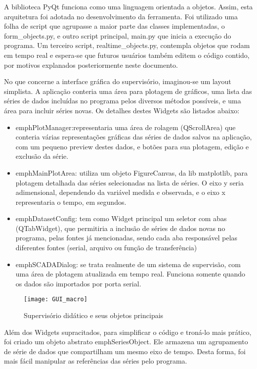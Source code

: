 A biblioteca PyQt funciona como uma linguagem orientada a objetos. Assim, esta arquitetura foi adotada no desenvolvimento da ferramenta. Foi utilizado uma folha de script que agrupasse a maior parte das classes implementadas, o form\_objects.py, e outro script principal, main.py que inicia a execução do programa. Um terceiro script, realtime\_objects.py, contempla objetos que rodam em tempo real e espera-se que futuros usuários também editem o código contido, por motivos explanados posteriormente neste documento.

No que concerne a interface gráfica do supervisório, imaginou-se um layout simplista. A aplicação conteria uma área para plotagem de gráficos, uma lista das séries de dados incluídas no programa pelos diversos métodos possíveis, e uma área para incluir séries novas. Os detalhes destes Widgets são listados abaixo:

\begin{itemize}
	\item emph{PlotManager}:representaria uma área de rolagem (QScrollArea) que conteria várias representações gráficas das séries de dados salvos na aplicação, com um pequeno preview destes dados, e botões para sua plotagem, edição e exclusão da série.
	\item emph{MainPlotArea}: utiliza um objeto FigureCanvas, da lib matplotlib, para plotagem detalhada das séries selecionadas na lista de séries. O eixo y seria adimensional, dependendo da variável medida e observada, e o eixo x representaria o tempo, em segundos.
	\item emph{DatasetConfig}: tem como Widget principal um seletor com abas (QTabWidget), que permitiria a inclusão de séries de dados novas no programa, pelas fontes já mencionadas, sendo cada aba responsável pelas diferentes fontes (serial, arquivo ou função de transferência)
	\item emph{SCADADialog}: se trata realmente de um sistema de supervisão, com uma área de plotagem atualizada em tempo real. Funciona somente quando os dados são importados por porta serial.
\end{itemize}

\begin{figure}[H]
	\centering
	\texttt{[image: GUI\_macro]}
	\caption{Supervisório didático e seus objetos principais}
	\label{img_gui_macro}
\end{figure}

Além dos Widgets supracitados, para simplificar o código e troná-lo mais prático, foi criado um objeto abstrato emph{SeriesObject}. Ele armazena um agrupamento de série de dados que compartilham um mesmo eixo de tempo. Desta forma, foi mais fácil manipular as referências das séries pelo programa.

